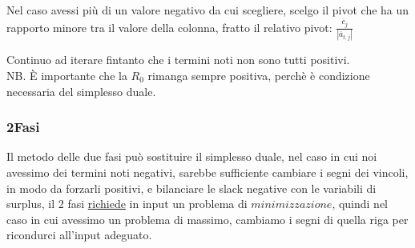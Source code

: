 \documentclass{article}
\begin{document}
\begin{center}
\end{center}

Nel caso avessi più di un valore negativo da cui scegliere, scelgo il pivot che ha un rapporto minore tra il valore della colonna, fratto il relativo pivot: $\frac{\overline{c}_j}{|\overline{a}_{t,j}|}$\\

\begin{center}
\end{center}
Continuo ad iterare fintanto che i termini noti non sono tutti positivi.\\
NB. È importante che la $R_0$ rimanga sempre positiva, perchè è condizione necessaria del simplesso duale.

\subsubsection{2Fasi}
Il metodo delle due fasi può sostituire il simplesso duale, nel caso in cui noi avessimo dei termini noti negativi, sarebbe sufficiente cambiare i segni dei vincoli, in modo da forzarli positivi, e bilanciare le slack negative con le variabili di surplus, il 2 fasi \underline{richiede} in input un problema di $minimizzazione$, quindi nel caso in cui avessimo un problema di massimo, cambiamo i segni di quella riga per ricondurci all'input adeguato.\\

\begin{center}
\end{center}
\end{document}
